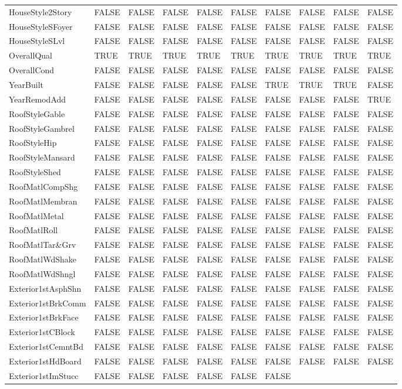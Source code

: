 \documentclass[]{article}
\begin{document}
\begin{longtable}[]{@{}llllllllll@{}}
HouseStyle2Story & FALSE & FALSE & FALSE & FALSE & FALSE & FALSE & FALSE
& FALSE & FALSE\tabularnewline
HouseStyleSFoyer & FALSE & FALSE & FALSE & FALSE & FALSE & FALSE & FALSE
& FALSE & FALSE\tabularnewline
HouseStyleSLvl & FALSE & FALSE & FALSE & FALSE & FALSE & FALSE & FALSE &
FALSE & FALSE\tabularnewline
OverallQual & TRUE & TRUE & TRUE & TRUE & TRUE & TRUE & TRUE & TRUE &
TRUE\tabularnewline
OverallCond & FALSE & FALSE & FALSE & FALSE & FALSE & FALSE & FALSE &
FALSE & FALSE\tabularnewline
YearBuilt & FALSE & FALSE & FALSE & FALSE & FALSE & TRUE & TRUE & TRUE &
FALSE\tabularnewline
YearRemodAdd & FALSE & FALSE & FALSE & FALSE & FALSE & FALSE & FALSE &
FALSE & TRUE\tabularnewline
RoofStyleGable & FALSE & FALSE & FALSE & FALSE & FALSE & FALSE & FALSE &
FALSE & FALSE\tabularnewline
RoofStyleGambrel & FALSE & FALSE & FALSE & FALSE & FALSE & FALSE & FALSE
& FALSE & FALSE\tabularnewline
RoofStyleHip & FALSE & FALSE & FALSE & FALSE & FALSE & FALSE & FALSE &
FALSE & FALSE\tabularnewline
RoofStyleMansard & FALSE & FALSE & FALSE & FALSE & FALSE & FALSE & FALSE
& FALSE & FALSE\tabularnewline
RoofStyleShed & FALSE & FALSE & FALSE & FALSE & FALSE & FALSE & FALSE &
FALSE & FALSE\tabularnewline
RoofMatlCompShg & FALSE & FALSE & FALSE & FALSE & FALSE & FALSE & FALSE
& FALSE & FALSE\tabularnewline
RoofMatlMembran & FALSE & FALSE & FALSE & FALSE & FALSE & FALSE & FALSE
& FALSE & FALSE\tabularnewline
RoofMatlMetal & FALSE & FALSE & FALSE & FALSE & FALSE & FALSE & FALSE &
FALSE & FALSE\tabularnewline
RoofMatlRoll & FALSE & FALSE & FALSE & FALSE & FALSE & FALSE & FALSE &
FALSE & FALSE\tabularnewline
RoofMatlTar\&Grv & FALSE & FALSE & FALSE & FALSE & FALSE & FALSE & FALSE
& FALSE & FALSE\tabularnewline
RoofMatlWdShake & FALSE & FALSE & FALSE & FALSE & FALSE & FALSE & FALSE
& FALSE & FALSE\tabularnewline
RoofMatlWdShngl & FALSE & FALSE & FALSE & FALSE & FALSE & FALSE & FALSE
& FALSE & FALSE\tabularnewline
Exterior1stAsphShn & FALSE & FALSE & FALSE & FALSE & FALSE & FALSE &
FALSE & FALSE & FALSE\tabularnewline
Exterior1stBrkComm & FALSE & FALSE & FALSE & FALSE & FALSE & FALSE &
FALSE & FALSE & FALSE\tabularnewline
Exterior1stBrkFace & FALSE & FALSE & FALSE & FALSE & FALSE & FALSE &
FALSE & FALSE & FALSE\tabularnewline
Exterior1stCBlock & FALSE & FALSE & FALSE & FALSE & FALSE & FALSE &
FALSE & FALSE & FALSE\tabularnewline
Exterior1stCemntBd & FALSE & FALSE & FALSE & FALSE & FALSE & FALSE &
FALSE & FALSE & FALSE\tabularnewline
Exterior1stHdBoard & FALSE & FALSE & FALSE & FALSE & FALSE & FALSE &
FALSE & FALSE & FALSE\tabularnewline
Exterior1stImStucc & FALSE & FALSE & FALSE & FALSE & FALSE & FALSE &

\end{longtable}
\end{document}
